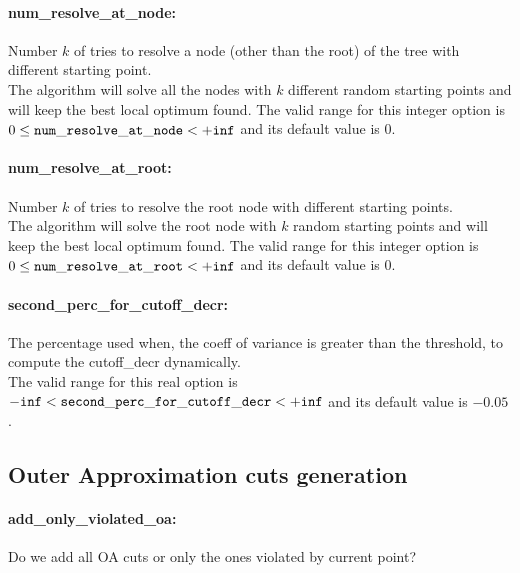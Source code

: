 \paragraph{num\_resolve\_at\_node:}\label{sec:num_resolve_at_node} Number $k$ of tries to resolve a node (other than the root) of the tree with different starting point. $\;$ \\
 The algorithm will solve all the nodes with $k$
different random starting points and will keep
the best local optimum found. The valid range for this integer option is
$0 \le {\tt num\_resolve\_at\_node } <  {\tt +inf}$
and its default value is $0$.


\paragraph{num\_resolve\_at\_root:}\label{sec:num_resolve_at_root} Number $k$ of tries to resolve the root node with different starting points. $\;$ \\
 The algorithm will solve the root node with $k$
random starting points and will keep the best
local optimum found. The valid range for this integer option is
$0 \le {\tt num\_resolve\_at\_root } <  {\tt +inf}$
and its default value is $0$.


\paragraph{second\_perc\_for\_cutoff\_decr:}\label{sec:second_perc_for_cutoff_decr} The percentage used when, the coeff of variance is greater than the threshold, to compute the cutoff\_decr dynamically. $\;$ \\
 The valid range for this real option is 
${\tt -inf} <  {\tt second\_perc\_for\_cutoff\_decr } <  {\tt +inf}$
and its default value is $-0.05$.


\subsection{Outer Approximation cuts generation}
\label{sec:Outer_Approximation_cuts_generation}
\paragraph{add\_only\_violated\_oa:}\label{sec:add_only_violated_oa} Do we add all OA cuts or only the ones violated by current point? $\;$ \\


